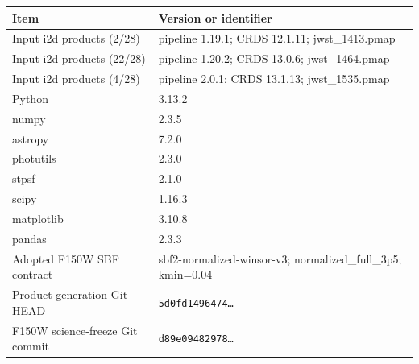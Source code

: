 \begin{tabular}{lp{5.2cm}}
\toprule
Item & Version or identifier \\
\midrule
Input i2d products (2/28) & pipeline 1.19.1; CRDS 12.1.11; jwst\_1413.pmap \\
Input i2d products (22/28) & pipeline 1.20.2; CRDS 13.0.6; jwst\_1464.pmap \\
Input i2d products (4/28) & pipeline 2.0.1; CRDS 13.1.13; jwst\_1535.pmap \\
Python & 3.13.2 \\
numpy & 2.3.5 \\
astropy & 7.2.0 \\
photutils & 2.3.0 \\
stpsf & 2.1.0 \\
scipy & 1.16.3 \\
matplotlib & 3.10.8 \\
pandas & 2.3.3 \\
Adopted F150W SBF contract & sbf2-normalized-winsor-v3; normalized\_full\_3p5; kmin=0.04 \\
Product-generation Git HEAD & \texttt{5d0fd1496474\ldots} \\
F150W science-freeze Git commit & \texttt{d89e09482978\ldots} \\
\bottomrule
\end{tabular}
